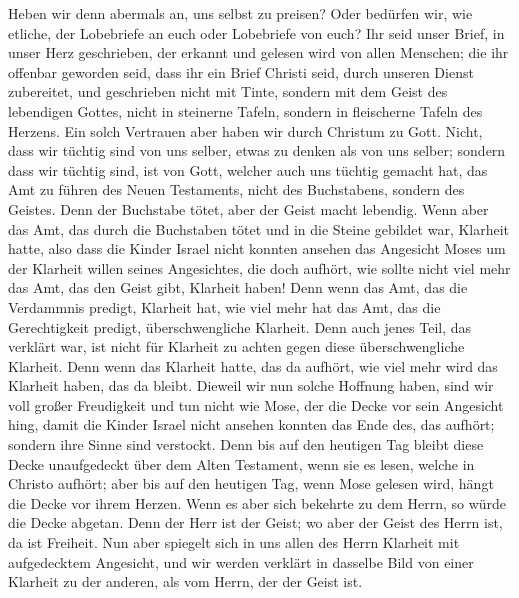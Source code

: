  Heben wir denn abermals an, uns selbst zu preisen? Oder
bedürfen wir, wie etliche, der Lobebriefe an euch oder Lobebriefe von
euch?  Ihr seid unser Brief, in unser Herz geschrieben,
der erkannt und gelesen wird von allen Menschen;  die ihr
offenbar geworden seid, dass ihr ein Brief Christi seid, durch unseren
Dienst zubereitet, und geschrieben nicht mit Tinte, sondern mit dem
Geist des lebendigen Gottes, nicht in steinerne Tafeln, sondern in
fleischerne Tafeln des Herzens.  Ein solch Vertrauen aber
haben wir durch Christum zu Gott.  Nicht, dass wir tüchtig
sind von uns selber, etwas zu denken als von uns selber; sondern dass
wir tüchtig sind, ist von Gott,  welcher auch uns tüchtig
gemacht hat, das Amt zu führen des Neuen Testaments, nicht des
Buchstabens, sondern des Geistes. Denn der Buchstabe tötet, aber der
Geist macht lebendig.  Wenn aber das Amt, das durch die
Buchstaben tötet und in die Steine gebildet war, Klarheit hatte, also
dass die Kinder Israel nicht konnten ansehen das Angesicht Moses um der
Klarheit willen seines Angesichtes, die doch aufhört,  wie
sollte nicht viel mehr das Amt, das den Geist gibt, Klarheit haben!
 Denn wenn das Amt, das die Verdammnis predigt, Klarheit
hat, wie viel mehr hat das Amt, das die Gerechtigkeit predigt,
überschwengliche Klarheit.  Denn auch jenes Teil, das
verklärt war, ist nicht für Klarheit zu achten gegen diese
überschwengliche Klarheit.  Denn wenn das Klarheit hatte,
das da aufhört, wie viel mehr wird das Klarheit haben, das da bleibt.
 Dieweil wir nun solche Hoffnung haben, sind wir voll
großer Freudigkeit  und tun nicht wie Mose, der die Decke
vor sein Angesicht hing, damit die Kinder Israel nicht ansehen konnten
das Ende des, das aufhört;  sondern ihre Sinne sind
verstockt. Denn bis auf den heutigen Tag bleibt diese Decke unaufgedeckt
über dem Alten Testament, wenn sie es lesen, welche in Christo aufhört;
 aber bis auf den heutigen Tag, wenn Mose gelesen wird,
hängt die Decke vor ihrem Herzen.  Wenn es aber sich
bekehrte zu dem Herrn, so würde die Decke abgetan.  Denn
der Herr ist der Geist; wo aber der Geist des Herrn ist, da ist
Freiheit.  Nun aber spiegelt sich in uns allen des Herrn
Klarheit mit aufgedecktem Angesicht, und wir werden verklärt in dasselbe
Bild von einer Klarheit zu der anderen, als vom Herrn, der der Geist
ist.

